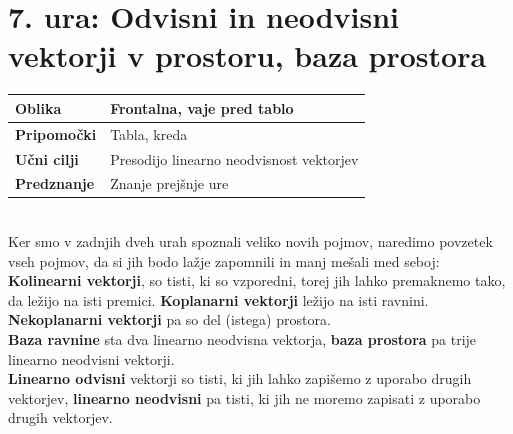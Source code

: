 \documentclass[a4paper,11pt]{article}
\begin{document}
\newpage \section{7. ura: Odvisni in neodvisni vektorji v prostoru, baza prostora}
\begin{tabularx}{\textwidth}{|>{\bfseries\RaggedRight}p{2.7cm}|X|}
\hline
Oblika & Frontalna, vaje pred tablo \\ \hline
Pripomočki & Tabla, kreda \\ \hline
Učni cilji &  Presodijo linearno neodvisnost vektorjev\\ \hline
Predznanje & Znanje  prejšnje ure \\ \hline

\end{tabularx}
\\

Ker smo v zadnjih dveh urah spoznali veliko novih pojmov, naredimo povzetek vseh pojmov, da si jih bodo lažje zapomnili in manj mešali med seboj:\\
\textbf{Kolinearni vektorji}, so tisti, ki so vzporedni, torej jih lahko premaknemo tako, da ležijo na isti premici. \textbf{Koplanarni vektorji} ležijo na isti ravnini. \textbf{Nekoplanarni vektorji} pa so del (istega) prostora.\\
\textbf{Baza ravnine} sta dva linearno neodvisna vektorja, \textbf{baza prostora} pa trije linearno neodvisni vektorji.\\
\textbf{Linearno odvisni} vektorji so tisti, ki jih lahko zapišemo z uporabo drugih vektorjev, \textbf{linearno neodvisni} pa tisti, ki jih ne moremo zapisati z uporabo drugih vektorjev.\\
\\
\end{document}
